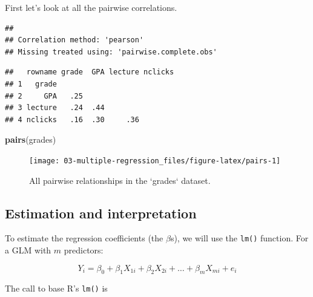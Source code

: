 \documentclass[]{book}
\newenvironment{Shaded}{\begin{snugshade}}{\end{snugshade}}
\newcommand{\KeywordTok}[1]{\textcolor[rgb]{0.13,0.29,0.53}{\textbf{#1}}}
\newcommand{\NormalTok}[1]{#1}
\newcommand{\OperatorTok}[1]{\textcolor[rgb]{0.81,0.36,0.00}{\textbf{#1}}}
\newcommand{\StringTok}[1]{\textcolor[rgb]{0.31,0.60,0.02}{#1}}
\begin{document}
First let's look at all the pairwise correlations.

\begin{Shaded}
\end{Shaded}

\begin{verbatim}
## 
## Correlation method: 'pearson'
## Missing treated using: 'pairwise.complete.obs'
\end{verbatim}

\begin{verbatim}
##   rowname grade  GPA lecture nclicks
## 1   grade                           
## 2     GPA   .25                     
## 3 lecture   .24  .44                
## 4 nclicks   .16  .30     .36
\end{verbatim}

\begin{Shaded}
\begin{Highlighting}[]
\KeywordTok{pairs}\NormalTok{(grades)}
\end{Highlighting}
\end{Shaded}

\begin{figure}

{\centering \texttt{[image: 03-multiple-regression\_files/figure-latex/pairs-1]} 

}

\caption{All pairwise relationships in the `grades` dataset.}\label{fig:pairs}
\end{figure}

\hypertarget{estimation-and-interpretation}{%
\subsection{Estimation and interpretation}\label{estimation-and-interpretation}}

To estimate the regression coefficients (the \(\beta\)s), we will use the \texttt{lm()} function. For a GLM with \(m\) predictors:

\[
Y_i = \beta_0 + \beta_1 X_{1i} + \beta_2 X_{2i} + \ldots + \beta_m X_{mi} + e_i
\]

The call to base R's \texttt{lm()} is
\end{document}
